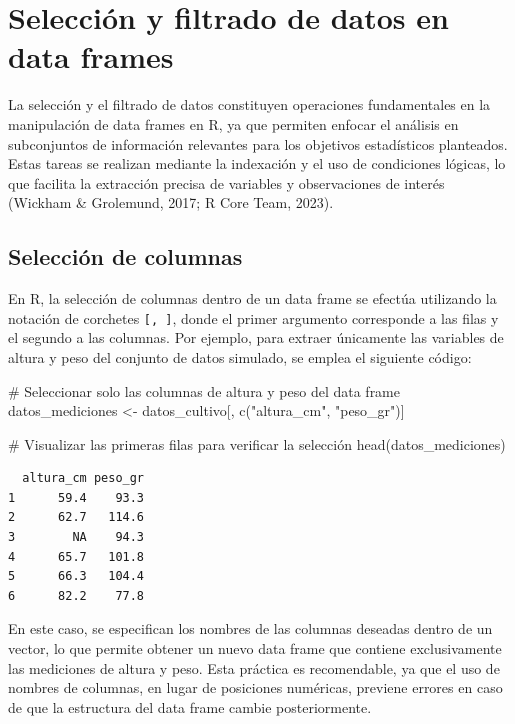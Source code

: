 \documentclass[
  spanish,
  a4paper,
  DIV=11,
  numbers=noendperiod,
  onepage,
  openany]{scrreprt}
\newenvironment{Shaded}{\begin{snugshade}}{\end{snugshade}}
\newcommand{\CommentTok}[1]{\textcolor[rgb]{0.37,0.37,0.37}{#1}}
\newcommand{\FunctionTok}[1]{\textcolor[rgb]{0.28,0.35,0.67}{#1}}
\newcommand{\NormalTok}[1]{\textcolor[rgb]{0.00,0.23,0.31}{#1}}
\newcommand{\OtherTok}[1]{\textcolor[rgb]{0.00,0.23,0.31}{#1}}
\newcommand{\StringTok}[1]{\textcolor[rgb]{0.13,0.47,0.30}{#1}}
\begin{document}
\section{Selección y filtrado de datos en data
frames}\label{selecciuxf3n-y-filtrado-de-datos-en-data-frames}

La selección y el filtrado de datos constituyen operaciones
fundamentales en la manipulación de data frames en R, ya que permiten
enfocar el análisis en subconjuntos de información relevantes para los
objetivos estadísticos planteados. Estas tareas se realizan mediante la
indexación y el uso de condiciones lógicas, lo que facilita la
extracción precisa de variables y observaciones de interés (Wickham \&
Grolemund, 2017; R Core Team, 2023).

\subsection{Selección de columnas}\label{selecciuxf3n-de-columnas}

En R, la selección de columnas dentro de un data frame se efectúa
utilizando la notación de corchetes \texttt{{[},\ {]}}, donde el primer
argumento corresponde a las filas y el segundo a las columnas. Por
ejemplo, para extraer únicamente las variables de altura y peso del
conjunto de datos simulado, se emplea el siguiente código:

\begin{Shaded}
\begin{Highlighting}[]
\CommentTok{\# Seleccionar solo las columnas de altura y peso del data frame}
\NormalTok{datos\_mediciones }\OtherTok{\textless{}{-}}\NormalTok{ datos\_cultivo[, }\FunctionTok{c}\NormalTok{(}\StringTok{"altura\_cm"}\NormalTok{, }\StringTok{"peso\_gr"}\NormalTok{)]}

\CommentTok{\# Visualizar las primeras filas para verificar la selección}
\FunctionTok{head}\NormalTok{(datos\_mediciones)}
\end{Highlighting}
\end{Shaded}

\begin{verbatim}
  altura_cm peso_gr
1      59.4    93.3
2      62.7   114.6
3        NA    94.3
4      65.7   101.8
5      66.3   104.4
6      82.2    77.8
\end{verbatim}

En este caso, se especifican los nombres de las columnas deseadas dentro
de un vector, lo que permite obtener un nuevo data frame que contiene
exclusivamente las mediciones de altura y peso. Esta práctica es
recomendable, ya que el uso de nombres de columnas, en lugar de
posiciones numéricas, previene errores en caso de que la estructura del
data frame cambie posteriormente.
\end{document}
